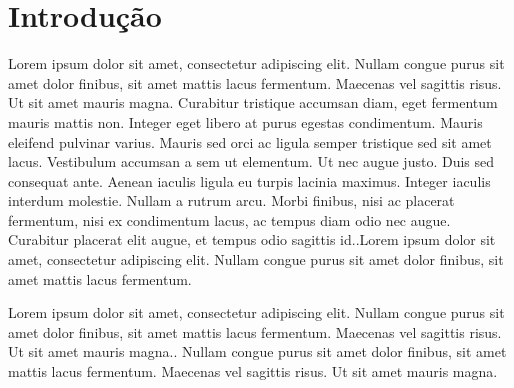 \documentclass[
	12pt,				%
	openright,			%
	oneside,			%
	a4paper,			%
	chapter=TITLE,		%
	english,			%
	brazil,				%
	]{abntex2}
\begin{document}
\chapter{Introdução}
\ABNTEXchapterfont
Lorem ipsum dolor sit amet, consectetur adipiscing elit. Nullam congue purus sit amet dolor finibus, sit amet mattis lacus fermentum. Maecenas vel sagittis risus. Ut sit amet mauris magna. Curabitur tristique accumsan diam, eget fermentum mauris mattis non. Integer eget libero at purus egestas condimentum. Mauris eleifend pulvinar varius. Mauris sed orci ac ligula semper tristique sed sit amet lacus. Vestibulum accumsan a sem ut elementum. Ut nec augue justo. Duis sed consequat ante. Aenean iaculis ligula eu turpis lacinia maximus. Integer iaculis interdum molestie. Nullam a rutrum arcu. Morbi finibus, nisi ac placerat fermentum, nisi ex condimentum lacus, ac tempus diam odio nec augue. Curabitur placerat elit augue, et tempus odio sagittis id.\cite{tzu2015arte}.Lorem ipsum dolor sit amet, consectetur adipiscing elit. Nullam congue purus sit amet dolor finibus, sit amet mattis lacus fermentum. 

Lorem ipsum dolor sit amet, consectetur adipiscing elit. Nullam congue purus sit amet dolor finibus, sit amet mattis lacus fermentum. Maecenas vel sagittis risus. Ut sit amet mauris magna.\cite{wu2001streaming}. Nullam congue purus sit amet dolor finibus, sit amet mattis lacus fermentum. Maecenas vel sagittis risus. Ut sit amet mauris magna.\cite{mao2006mrtp}
\end{document}
